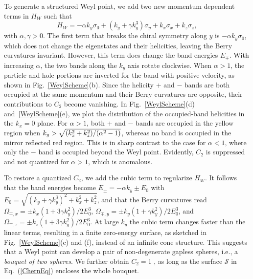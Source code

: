 \documentclass[prl,aps,twocolumn,showpacs,floatfix]{revtex4}
\begin{document}
To generate a structured Weyl point, we add two new momentum dependent terms
in $H_{W}$ such that
\begin{equation}
H_{W}=-\alpha k_{y}\sigma _{0}+(k_{y}+\gamma k_{y}^{3})\sigma
_{y}+k_{x}\sigma _{x}+k_{z}\sigma _{z},  \label{Ham}
\end{equation}%
with $\alpha ,\gamma >0$. The first term that breaks the chiral symmetry
along $y$ is $-\alpha k_{y}\sigma _{0}$, which does not change the
eigenstates and their helicities, leaving the Berry curvatures invariant.
However, this term does change the band energies $E_{\mp }$. With increasing
$\alpha $, the two bands along the ${k}_{y}$ axis rotate clockwise. When $%
\alpha >1$, the particle and hole portions are inverted for the band with
positive velocity, as shown in Fig.~\ref{WeylScheme}(b). Since the helicity $%
+$ and $-$ bands are both occupied at the same momentum and their Berry
curvatures are opposite, their contributions to $C_{2}$ become vanishing. In
Fig.~\ref{WeylScheme}(d) and~\ref{WeylScheme}(e), we plot the distribution
of the occupied-band helicities in the $k_{x}=0$ plane. For $\alpha >1$,
both $+$ and $-$ bands are occupied in the yellow region when $k_{y}>\sqrt{%
(k_{x}^{2}+k_{z}^{2})/(\alpha ^{2}-1)}$, whereas no band is occupied in the
mirror reflected red region. This is in sharp contrast to the case for $%
\alpha <1$, where only the $-$ band is occupied beyond the Weyl point.
Evidently, $C_{2}$ is suppressed and not quantized for $\alpha >1$, which is
anomalous.

To restore a quantized $C_{2}$, we add the cubic term to regularize $H_{W}$.
It follows that the band energies become $E_{\pm }=-\alpha k_{y}\pm E_{0}$
with $E_{0}=\sqrt{(k_{y}+\gamma k_{y}^{3})^{2}+k_{x}^{2}+k_{z}^{2}}$, and
that the Berry curvatures read $\Omega _{{\mp },x}=\pm k_{x}(1+3\gamma
k_{y}^{2})/2E_{0}^{3}$, $\Omega _{{\mp },y}=\pm k_{y}(1+\gamma
k_{y}^{2})/2E_{0}^{3}$, and $\Omega _{{\mp },z}=\pm k_{z}(1+3\gamma
k_{y}^{2})/2E_{0}^{3}$. At large $k_{y}$ the cubic term changes faster than
the linear terms, resulting in a finite zero-energy surface, as sketched in
Fig.~\ref{WeylScheme}(c) and (f), instead of an infinite cone structure.
This suggests that a Weyl point can develop a pair of non-degenerate gapless
spheres, i.e., a \textit{bouquet of two spheres}. We further obtain $C_{2}=1$%
, as long as the surface $\mathcal{S}$ in Eq.~(\ref{ChernEq}) encloses the
whole bouquet.
\end{document}
